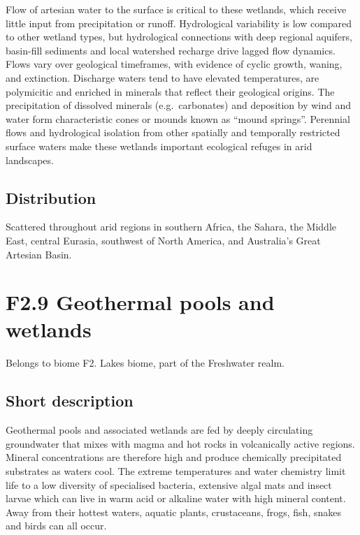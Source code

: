 \documentclass[
  letterpaper,
  DIV=11,
  numbers=noendperiod]{scrartcl}
\begin{document}
Flow of artesian water to the surface is critical to these wetlands,
which receive little input from precipitation or runoff. Hydrological
variability is low compared to other wetland types, but hydrological
connections with deep regional aquifers, basin-fill sediments and local
watershed recharge drive lagged flow dynamics. Flows vary over
geological timeframes, with evidence of cyclic growth, waning, and
extinction. Discharge waters tend to have elevated temperatures, are
polymicitic and enriched in minerals that reflect their geological
origins. The precipitation of dissolved minerals (e.g.~carbonates) and
deposition by wind and water form characteristic cones or mounds known
as ``mound springs''. Perennial flows and hydrological isolation from
other spatially and temporally restricted surface waters make these
wetlands important ecological refuges in arid landscapes.

\subsection{Distribution}\label{distribution-15}

Scattered throughout arid regions in southern Africa, the Sahara, the
Middle East, central Eurasia, southwest of North America, and
Australia's Great Artesian Basin.

\section{F2.9 Geothermal pools and
wetlands}\label{f2.9-geothermal-pools-and-wetlands}

Belongs to biome F2. Lakes biome, part of the Freshwater realm.

\subsection{Short description}\label{short-description-16}

Geothermal pools and associated wetlands are fed by deeply circulating
groundwater that mixes with magma and hot rocks in volcanically active
regions. Mineral concentrations are therefore high and produce
chemically precipitated substrates as waters cool. The extreme
temperatures and water chemistry limit life to a low diversity of
specialised bacteria, extensive algal mats and insect larvae which can
live in warm acid or alkaline water with high mineral content. Away from
their hottest waters, aquatic plants, crustaceans, frogs, fish, snakes
and birds can all occur.
\end{document}
